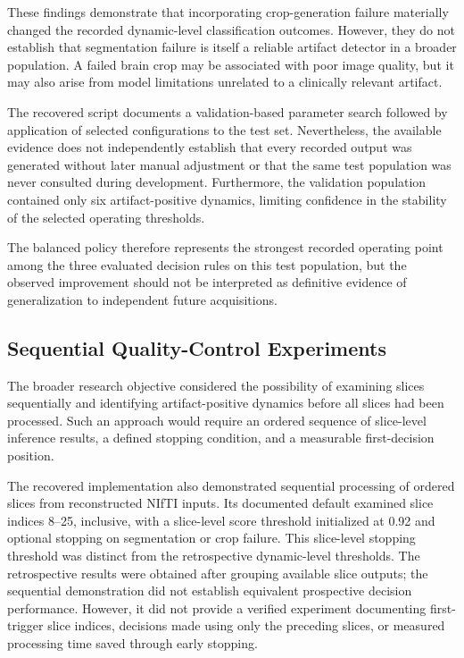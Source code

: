 These findings demonstrate that incorporating crop-generation failure materially changed the recorded dynamic-level classification outcomes. However, they do not establish that segmentation failure is itself a reliable artifact detector in a broader population. A failed brain crop may be associated with poor image quality, but it may also arise from model limitations unrelated to a clinically relevant artifact.

The recovered script documents a validation-based parameter search followed by application of selected configurations to the test set. Nevertheless, the available evidence does not independently establish that every recorded output was generated without later manual adjustment or that the same test population was never consulted during development. Furthermore, the validation population contained only six artifact-positive dynamics, limiting confidence in the stability of the selected operating thresholds.

The balanced policy therefore represents the strongest recorded operating point among the three evaluated decision rules on this test population, but the observed improvement should not be interpreted as definitive evidence of generalization to independent future acquisitions.

\subsection{Sequential Quality-Control Experiments}
\label{subsec:results_sequential_status}

The broader research objective considered the possibility of examining slices sequentially and identifying artifact-positive dynamics before all slices had been processed. Such an approach would require an ordered sequence of slice-level inference results, a defined stopping condition, and a measurable first-decision position.

The recovered implementation also demonstrated sequential processing of ordered slices from reconstructed NIfTI inputs. Its documented default examined slice indices 8--25, inclusive, with a slice-level score threshold initialized at 0.92 and optional stopping on segmentation or crop failure. This slice-level stopping threshold was distinct from the retrospective dynamic-level thresholds. The retrospective results were obtained after grouping available slice outputs; the sequential demonstration did not establish equivalent prospective decision performance. However, it did not provide a verified experiment documenting first-trigger slice indices, decisions made using only the preceding slices, or measured processing time saved through early stopping.

